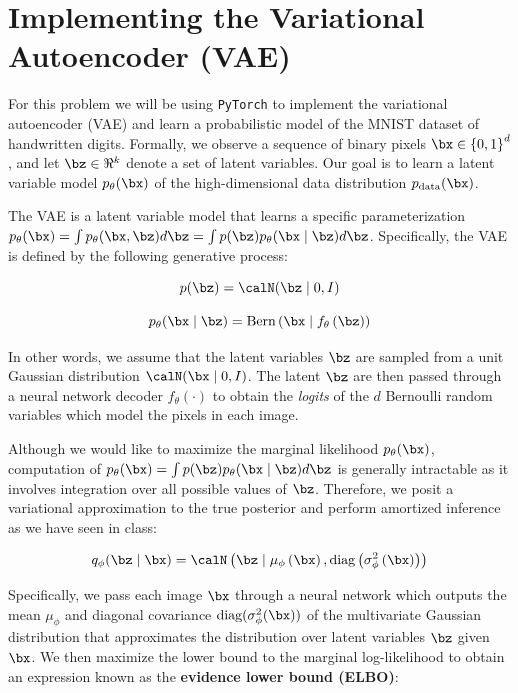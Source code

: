 \section{Implementing the Variational Autoencoder (VAE)} \label{p1}

For this problem we will be using \texttt{PyTorch} to implement the variational autoencoder (VAE) and learn a 
probabilistic model of the MNIST dataset of handwritten digits. Formally, we observe a sequence of binary pixels 
$\bx \in {\{0,1\}}^{d}$, and let $\bz \in \Re^{k}$ denote a set of latent variables. Our goal is to learn a 
latent variable model $p_{\theta}(\bx)$ of the high-dimensional data distribution $p_{\text{data}}(\bx)$.

The VAE is a latent variable model that learns a specific parameterization $p_{\theta}(\bx) = \int p_{\theta}(\bx, \bz)d\bz
= \int p(\bz)p_{\theta}(\bx \mid \bz)d\bz$. Specifically, the VAE is defined by the following generative process:

\begin{equation} \label{eq:1}
    p(\bz) = \calN(\bz \mid 0, I)
\end{equation}

\begin{equation} \label{eq:2}
    p_{\theta}(\bx \mid \bz) = \text{Bern}\left(\bx \mid f_{\theta}\left(\bz\right)\right)
\end{equation}

In other words, we assume that the latent variables $\bz$ are sampled from a unit Gaussian distribution 
$\calN(\bx \mid 0,I)$. The latent $\bz$ are then passed through a neural network decoder $f_{\theta}(\cdot)$ to obtain the 
\textit{logits} of the $d$ Bernoulli random variables which model the pixels in each image.

Although we would like to maximize the marginal likelihood $p_{\theta}(\bx)$, computation of $p_{\theta}(\bx) =
\int p(\bz) p_{\theta}(\bx \mid \bz)d\bz$ is generally intractable as it involves integration over all possible values of $\bz$. 
Therefore, we posit a variational approximation to the true posterior and perform amortized inference as we have seen in class:

\begin{equation} \label{eq:3}
    q_{\phi}(\bz \mid \bx) = \calN\left(\bz \mid \mu_{\phi}\left(\bx\right), \text{diag}\left(\sigma_{\phi}^2\left(\bx\right)\right)\right)
\end{equation}

Specifically, we pass each image $\bx$ through a neural network which outputs the mean $\mu_{\phi}$ and diagonal covariance 
$\text{diag}(\sigma_{\phi}^2(\bx))$ of the multivariate Gaussian distribution that approximates the distribution over latent 
variables $\bz$ given $\bx$. We then maximize the lower bound to the marginal log-likelihood to obtain an expression known as 
the \textbf{evidence lower bound (ELBO)}:

